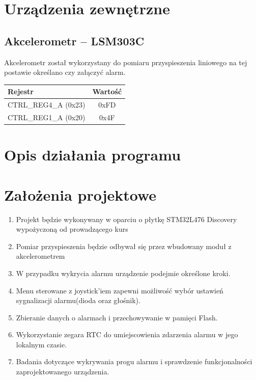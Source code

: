 \documentclass[10pt, a4paper]{article}
\begin{document}
\section{Urządzenia zewnętrzne}
\subsection{Akcelerometr -- LSM303C}
Akcelerometr został wykorzystany do pomiaru przyspieszenia liniowego na tej postawie określano czy załączyć alarm.
\begin{table}[H]
\centering
\begin{tabular}{|l|c|}
\hline 
\textbf{Rejestr} &\textbf{Wartość} \\ \hline \hline
CTRL\_REG4\_A (0x23) & 0xFD \\ \hline
CTRL\_REG1\_A (0x20) & 0x4F \\ \hline

\end{tabular}
\end{table}

\section{Opis działania programu}


\section{Założenia projektowe}
\begin{enumerate}
\item Projekt będzie wykonywany w oparciu o płytkę STM32L476 Discovery wypożyczoną od prowadzącego kurs
\item Pomiar przyspieszenia będzie odbywał się przez wbudowany moduł z akcelerometrem
\item W przypadku wykrycia alarmu urządzenie podejmie określone kroki.
\item Menu sterowane z joystick'iem zapewni możliwość wybór ustawień sygnalizacji alarmu(dioda oraz głośnik).
\item Zbieranie danych o alarmach i przechowywanie w pamięci Flash.
\item Wykorzystanie zegara RTC do umiejscowienia zdarzenia alarmu w jego lokalnym czasie.
\item Badania dotyczące wykrywania progu alarmu i sprawdzenie funkcjonalności zaprojektowanego urządzenia.

\end{enumerate}
\end{document}
